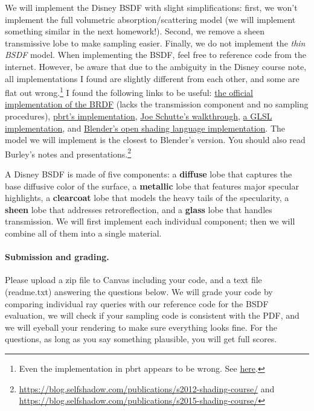 We will implement the Disney BSDF with slight simplifications: first, we won't implement the full volumetric absorption/scattering model (we will implement something similar in the next homework!). Second, we remove a sheen transmissive lobe to make sampling easier. Finally, we do not implement the \emph{thin BSDF} model. When implementing the BSDF, feel free to reference code from the internet. However, be aware that due to the ambiguity in the Disney course note, all implementations I found are slightly different from each other, and some are flat out wrong.\footnote{Even the implementation in pbrt appears to be wrong. See \href{https://github.com/mmp/pbrt-v3/issues/313}{here}.} I found the following links to be useful: \href{https://github.com/wdas/brdf/blob/main/src/brdfs/disney.brdf}{the official implementation of the BRDF} (lacks the transmission component and no sampling procedures), \href{https://github.com/mmp/pbrt-v3/blob/master/src/materials/disney.cpp}{pbrt's implementation}, \href{https://schuttejoe.github.io/post/disneybsdf/}{Joe Schutte's walkthrough}, \href{https://github.com/knightcrawler25/GLSL-PathTracer/blob/master/src/shaders/common/disney.glsl}{a GLSL implementation}, and \href{https://github.com/dfelinto/blender/blob/master/intern/cycles/kernel/shaders/node_principled_bsdf.osl}{Blender's open shading language implementation}. The model we will implement is the closest to Blender's version. You should also read Burley's notes and presentations.\footnote{\url{https://blog.selfshadow.com/publications/s2012-shading-course/} and \url{https://blog.selfshadow.com/publications/s2015-shading-course/}}

A Disney BSDF is made of five components: a \textbf{diffuse} lobe that captures the base diffusive color of the surface, a \textbf{metallic} lobe that features major specular highlights, a \textbf{clearcoat} lobe that models the heavy tails of the specularity, a \textbf{sheen} lobe that addresses retroreflection, and a \textbf{glass} lobe that handles transmission. We will first implement each individual component; then we will combine all of them into a single material. 

\paragraph{Submission and grading.} Please upload a zip file to Canvas including your code, and a text file (readme.txt) answering the questions below. We will grade your code by comparing individual ray queries with our reference code for the BSDF evaluation, we will check if your sampling code is consistent with the PDF, and we will eyeball your rendering to make sure everything looks fine. For the questions, as long as you say something plausible, you will get full scores.

